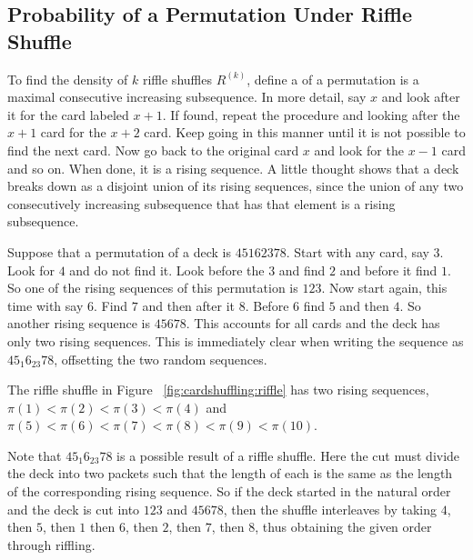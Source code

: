 \documentclass[12pt]{article}
\begin{document}
\subsection*{Probability of a Permutation Under Riffle Shuffle}

To find the density of \( k \) riffle shuffles \( R^{(k)} \), define a
%
of a permutation is a maximal consecutive increasing subsequence.  In
more detail, say \( x \) and look after it for the card labeled \( x+1 \).
If found, repeat the procedure and looking after the \( x+1 \) card for
the \( x+2 \) card.  Keep going in this manner until it is not possible
to find the next card.  Now go back to the original card \( x \) and
look for the \( x-1 \) card and so on.  When done, it is a rising
sequence.  A little thought shows that a deck breaks down as a disjoint
union of its rising sequences, since the union of any two consecutively
increasing subsequence that has that element is a rising subsequence.

\begin{example}
    Suppose that a permutation of a deck is \( 45162378 \).  Start with
    any card, say \( 3 \).  Look for \( 4 \) and do not find it.  Look
    before the \( 3 \) and find \( 2 \) and before it find \( 1 \).  So
    one of the rising sequences of this permutation is \( 123 \).  Now
    start again, this time with say \( 6 \).  Find \( 7 \) and then
    after it \( 8 \).  Before \( 6 \) find \( 5 \) and then \( 4 \).  So
    another rising sequence is \( 45678 \).  This accounts for all cards
    and the deck has only two rising sequences.  This is immediately
    clear when writing the sequence as \( 45_{1}6_{23}78 \), offsetting
    the two random sequences.
\end{example}

\begin{example}
    The riffle shuffle in Figure~%
    \ref{fig:cardshuffling:riffle} has two rising sequences, \( \pi(1) <
    \pi(2) < \pi(3) < \pi(4) \) and \( \pi(5) < \pi(6) < \pi(7) < \pi(8)
    < \pi(9) < \pi(10) \).
\end{example}

\begin{example}
    Note that \( 45_{1}6_{23}78 \) is a possible result of a riffle
    shuffle. Here the cut must divide the deck into two packets such
    that the length of each is the same as the length of the
    corresponding rising sequence.  So if the deck started in the
    natural order and the deck is cut into \( 123 \) and \( 45678 \),
    then the shuffle interleaves by taking \( 4 \), then \( 5 \), then \(
    1 \) then \( 6 \), then \( 2 \), then \( 7 \), then \( 8 \), thus
    obtaining the given order through riffling.
\end{example}
\end{document}

